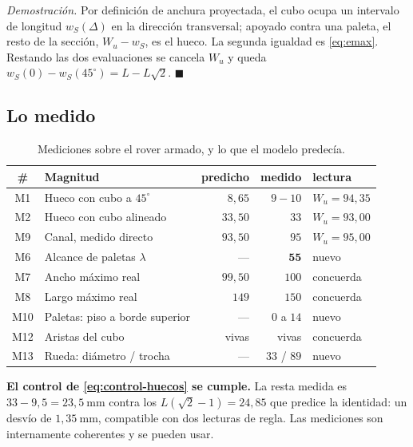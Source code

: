 \documentclass[11pt,a4paper]{article}
\theoremstyle{definition}
\newenvironment{demo}{\par\noindent\textit{Demostración.}\;}{\hfill$\blacksquare$\par\medskip}
\newcommand{\grados}{^{\circ}}
\begin{document}
\begin{demo}
Por definición de anchura proyectada, el cubo ocupa un intervalo de longitud
$w_S(\Delta)$ en la dirección transversal; apoyado contra una paleta, el resto de la
sección, $W_u - w_S$, es el hueco. La segunda igualdad es \eqref{eq:emax}. Restando las
dos evaluaciones se cancela $W_u$ y queda $w_S(0)-w_S(45\grados) = L - L\sqrt2$.
\end{demo}

\subsection{Lo medido}

\begin{table}[htbp]
\centering
\small
\caption{Mediciones sobre el rover armado, y lo que el modelo predecía.}
\begin{tabular}{clrrl}
\toprule
\# & Magnitud & predicho & medido & lectura \\
\midrule
M1  & Hueco con cubo a $45\grados$ & $8{,}65$ & $9{-}10$ & $W_u = 94{,}35$ \\
M2  & Hueco con cubo alineado & $33{,}50$ & $33$ & $W_u = 93{,}00$ \\
M9  & Canal, medido directo & $93{,}50$ & $95$ & $W_u = 95{,}00$ \\
\midrule
M6  & Alcance de paletas $\lambda$ & --- & $\mathbf{55}$ & nuevo \\
M7  & Ancho máximo real & $99{,}50$ & $100$ & concuerda \\
M8  & Largo máximo real & $149$ & $150$ & concuerda \\
M10 & Paletas: piso a borde superior & --- & $0$ a $14$ & nuevo \\
M12 & Aristas del cubo & vivas & vivas & concuerda \\
M13 & Rueda: diámetro / trocha & --- & $33$ / $89$ & nuevo \\
\bottomrule
\end{tabular}
\end{table}

\begin{resultado}
\textbf{El control de \eqref{eq:control-huecos} se cumple.} La resta medida es
$33 - 9{,}5 = 23{,}5\ \mathrm{mm}$ contra los $L(\sqrt2-1) = 24{,}85$ que predice la
identidad: un desvío de $1{,}35\ \mathrm{mm}$, compatible con dos lecturas de regla. Las
mediciones son internamente coherentes y se pueden usar.
\end{resultado}
\end{document}
